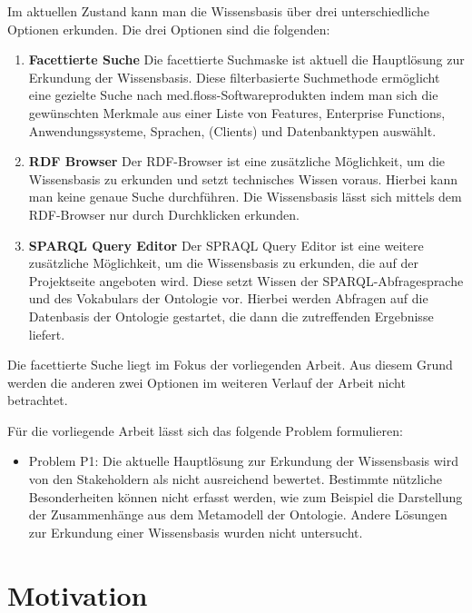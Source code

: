 Im aktuellen Zustand kann man die Wissensbasis über drei unterschiedliche Optionen erkunden.
Die drei Optionen sind die folgenden:
\begin{enumerate}
\item \textbf{Facettierte Suche}
\newline Die facettierte Suchmaske ist aktuell die Hauptlösung zur Erkundung der Wissensbasis. 
Diese filterbasierte Suchmethode ermöglicht eine gezielte Suche nach med.floss-Softwareprodukten indem man sich die gewünschten Merkmale aus einer Liste von Features, Enterprise Functions, Anwendungssysteme, Sprachen, (Clients) und Datenbanktypen auswählt. 
\item \textbf {RDF Browser}
\newline Der RDF-Browser ist eine zusätzliche Möglichkeit, um die Wissensbasis zu erkunden und setzt technisches Wissen voraus.
Hierbei kann man keine genaue Suche durchführen.
Die Wissensbasis lässt sich mittels dem RDF-Browser nur durch Durchklicken erkunden. 
\item \textbf {SPARQL Query Editor }
\newline Der SPRAQL Query Editor ist eine weitere zusätzliche Möglichkeit, um die Wissensbasis zu erkunden, die auf der Projektseite angeboten wird. 
Diese setzt Wissen der SPARQL-Abfragesprache und des Vokabulars der Ontologie vor.
Hierbei werden Abfragen auf die Datenbasis der Ontologie gestartet, die dann die zutreffenden Ergebnisse liefert.
\end{enumerate} 

Die facettierte Suche liegt im Fokus der vorliegenden Arbeit. 
Aus diesem Grund werden die anderen zwei Optionen im weiteren Verlauf der Arbeit nicht betrachtet.

Für die vorliegende Arbeit lässt sich das folgende Problem formulieren:

\begin{itemize}
\item Problem P1: Die aktuelle Hauptlösung zur Erkundung der Wissensbasis wird von den Stakeholdern als nicht ausreichend bewertet.
Bestimmte nützliche Besonderheiten können nicht erfasst werden, wie zum Beispiel die Darstellung der Zusammenhänge aus dem Metamodell der Ontologie. 
Andere Lösungen zur Erkundung einer Wissensbasis wurden nicht untersucht.
\end{itemize}

\section{Motivation}\label{sec:motivation}

